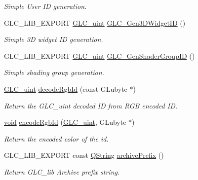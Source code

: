 \begin{DoxyCompactItemize}
\begin{DoxyCompactList}\small\item\em Simple User I\-D generation. \end{DoxyCompactList}\item 
G\-L\-C\-\_\-\-L\-I\-B\-\_\-\-E\-X\-P\-O\-R\-T \hyperlink{glc__global_8h_abf950976fabed69026558df8e2da6c6b}{G\-L\-C\-\_\-uint} \hyperlink{namespaceglc_a53a170bb339aeb4bf47195fecdfd22e7}{G\-L\-C\-\_\-\-Gen3\-D\-Widget\-I\-D} ()
\begin{DoxyCompactList}\small\item\em Simple 3\-D widget I\-D generation. \end{DoxyCompactList}\item 
G\-L\-C\-\_\-\-L\-I\-B\-\_\-\-E\-X\-P\-O\-R\-T \hyperlink{glc__global_8h_abf950976fabed69026558df8e2da6c6b}{G\-L\-C\-\_\-uint} \hyperlink{namespaceglc_ab2d8053113dd1cff6846f75004e28e9f}{G\-L\-C\-\_\-\-Gen\-Shader\-Group\-I\-D} ()
\begin{DoxyCompactList}\small\item\em Simple shading group generation. \end{DoxyCompactList}\item 
\hyperlink{glc__global_8h_abf950976fabed69026558df8e2da6c6b}{G\-L\-C\-\_\-uint} \hyperlink{namespaceglc_aa3062cc160a93d7e4dfb127d22e8a70b}{decode\-Rgb\-Id} (const G\-Lubyte $\ast$)
\begin{DoxyCompactList}\small\item\em Return the G\-L\-C\-\_\-uint decoded I\-D from R\-G\-B encoded I\-D. \end{DoxyCompactList}\item 
\hyperlink{group___u_a_v_objects_plugin_ga444cf2ff3f0ecbe028adce838d373f5c}{void} \hyperlink{namespaceglc_a7dd371cbe3e97965b6fbcc5ddca01026}{encode\-Rgb\-Id} (\hyperlink{glc__global_8h_abf950976fabed69026558df8e2da6c6b}{G\-L\-C\-\_\-uint}, G\-Lubyte $\ast$)
\begin{DoxyCompactList}\small\item\em Return the encoded color of the id. \end{DoxyCompactList}\item 
G\-L\-C\-\_\-\-L\-I\-B\-\_\-\-E\-X\-P\-O\-R\-T const \hyperlink{group___u_a_v_objects_plugin_gab9d252f49c333c94a72f97ce3105a32d}{Q\-String} \hyperlink{namespaceglc_ae9f19792a615adb0e03778f0fcbb8aef}{archive\-Prefix} ()
\begin{DoxyCompactList}\small\item\em Return G\-L\-C\-\_\-lib Archive prefix string. \end{DoxyCompactList}\item 

\end{DoxyCompactItemize}
